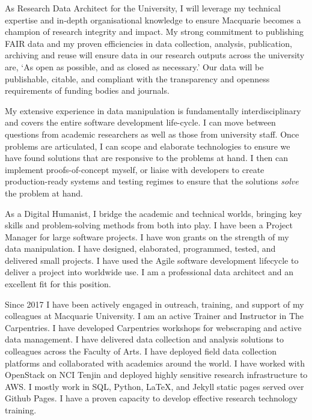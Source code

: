 \documentclass[11pt, a4paper]{awesome-cv}
\begin{document}
\begin{cvletter}

As Research Data Architect for the University, I will leverage my technical expertise and in-depth organisational knowledge to ensure Macquarie becomes a champion of research integrity and impact. My strong commitment to publishing FAIR data and my proven efficiencies in data collection, analysis, publication, archiving and reuse will ensure data in our research outputs across the university are, `As open as possible, and as closed as necessary.' Our data will be publishable, citable, and compliant with the transparency and openness requirements of funding bodies and journals.

My extensive experience in data manipulation is fundamentally interdisciplinary and covers the entire software development life-cycle. I can move between questions from academic researchers as well as those from university staff. Once problems are articulated, I can scope and elaborate technologies to ensure we have found solutions that are responsive to the problems at hand. I then can implement proofs-of-concept myself, or liaise with developers to create production-ready systems and testing regimes to ensure that the solutions \textit{solve} the problem at hand. 

As a Digital Humanist, I bridge the academic and technical worlds, bringing key skills and problem-solving methods from both into play. I have been a Project Manager for large software projects. I have won grants on the strength of my data manipulation. I have designed, elaborated, programmed, tested, and delivered small projects. I have used the Agile software development lifecycle to deliver a project into worldwide use. I am a professional data architect and an excellent fit for this position.


\clearpage




Since 2017 I have been actively engaged in outreach, training, and support of my colleagues at Macquarie University. I am an active Trainer and Instructor in The Carpentries. I have developed Carpentries workshops for webscraping and active data management. I have delivered data collection and analysis solutions to colleagues across the Faculty of Arts. I have deployed field data collection platforms and collaborated with academics around the world. I have worked with OpenStack on NCI Tenjin and deployed highly sensitive research infrastructure to AWS. I mostly work in SQL, Python, \LaTeX{}, and Jekyll static pages served over Github Pages. I have a proven capacity to develop effective research technology training.



\end{cvletter}
\end{document}
